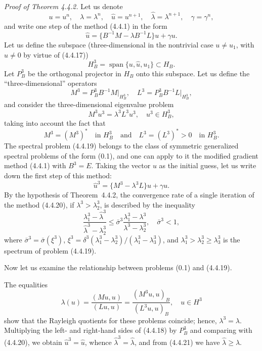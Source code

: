 \documentclass[11pt,oneside]{book}
\newcommand{\myspan}{\operatorname{span}}
\begin{document}
\textit{Proof of Theorem 4.4.2.} Let us denote
\[
u = u^n, \quad \lambda = \lambda^n, \quad \hat{u} = u^{n+1}, \quad \hat{\lambda} = \lambda^{n+1}, \quad \gamma = \gamma^n,
\]
and write one step of the method (4.4.1) in the form
\[
\hat{u} = \{B^{-1}M - \lambda B^{-1}L\}u + \gamma u. \tag{4.4.18}
\]
Let us define the subspace (three-dimensional in the nontrivial case $u \neq u_1$, with $\hat{u} \neq 0$ by virtue of (4.4.17))
\[
H_B^3 = \myspan\{u, \hat{u}, u_1\} \subset H_B.
\]
Let $P_B^3$ be the orthogonal projector in $H_B$ onto this subspace. Let us define the ``three-dimensional'' operators
\[
M^3 = P_B^3 B^{-1} M\big|_{H_B^3}, \quad L^3 = P_B^3 B^{-1} L\big|_{H_B^3},
\]
and consider the three-dimensional eigenvalue problem
\[
M^3 u^3 = \lambda^3 L^3 u^3, \quad u^3 \in H_B^3, \tag{4.4.19}
\]
taking into account the fact that
\[
M^3 = (M^3)^* \quad \text{in } H_B^3 \quad \text{and} \quad L^3 = (L^3)^* > 0 \quad \text{in } H_B^3.
\]
The spectral problem (4.4.19) belongs to the class of symmetric generalized spectral problems of the form (0.1), and one can apply to it the modified gradient method (4.4.1) with $B^3 = E$. Taking the vector $u$ as the initial guess, let us write down the first step of this method:
\[
\hat{u}^3 = \{M^3 - \lambda^3 L\}u + \gamma u. \tag{4.4.20} %
\]
By the hypothesis of Theorem~4.4.2, the convergence rate of a single iteration of the method (4.4.20), if $\lambda^3 > \lambda_2^3$, is described by the inequality
\[
\frac{\lambda_1^3 - \hat{\lambda}^3}{\hat{\lambda}^3 - \lambda_2^3} \leqslant \bar{\sigma}^3 \frac{\lambda_1^3 - \lambda^3}{\lambda^3 - \lambda_2^3}, \quad \bar{\sigma}^3 < 1, \tag{4.4.21}
\]
where $\bar{\sigma}^3 = \bar{\sigma}(\xi^3)$, $\xi^3 = \delta^3(\lambda_1^3 - \lambda_2^3)/(\lambda_1^3 - \lambda_3^3)$, and $\lambda_1^3 > \lambda_2^3 \geqslant \lambda_3^3$ is the spectrum of problem (4.4.19). %

Now let us examine the relationship between problems (0.1) and (4.4.19).

The equalities
\[
\lambda(u) = \frac{(Mu, u)}{(Lu, u)} = \frac{(M^3 u, u)_B}{(L^3 u, u)_B}, \quad u \in H^3 %
\]
show that the Rayleigh quotients %
for these problems coincide; hence, $\lambda^3 = \lambda$. Multiplying the left- and right-hand sides of (4.4.18) by $P_B^3$ and comparing with (4.4.20), we obtain $\hat{u}^3 = \hat{u}$, whence $\hat{\lambda}^3 = \hat{\lambda}$, and from (4.4.21) we have $\hat{\lambda} \geqslant \lambda$.
\end{document}
